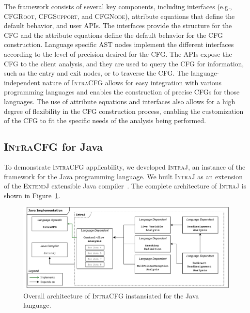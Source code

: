 The framework consists of several key components, including interfaces
(e.g., \textsc{CFGRoot}, \textsc{CFGSupport}, and \textsc{CFGNode}), attribute equations that define the
default behavior, and user APIs. The interfaces provide the structure for the
CFG and the attribute equations define the default behavior for the CFG
construction. Language specific AST nodes implement the different interfaces
according to the level of precision desired for the CFG.
The APIs expose the CFG to the client analysis, and they are used to query the CFG
for information, such as the entry and exit nodes, or to traverse the CFG.
The language-independent nature of \textsc{IntraCFG} allows for easy integration
with various programming languages and enables the construction of precise CFGs
for those languages. The use of attribute equations and interfaces also allows
for a high degree of flexibility in the CFG construction process,
enabling the customization of the CFG to fit the specific needs of the
analysis being performed.






\subsection{\textsc{IntraCFG} for Java}
To demonstrate \textsc{IntraCFG} applicability, we developed
\textsc{IntraJ}, an instance of the framework for the Java programming language.
We built \textsc{IntraJ} as an extension of the \textsc{ExtendJ} extensible Java compiler~\cite{DBLP:conf/oopsla/EkmanH07}.
The complete architecture of \textsc{IntraJ} is shown in Figure~\ref{fig:intraJ}.
\begin{figure}[H]
    \centering
    \includegraphics[scale=0.52]{kappa/img/architecturejava.pdf}
    \caption{\label{fig:intraJ} Overall architecture of \textsc{IntraCFG} instansiated for the Java language.}
\end{figure}

